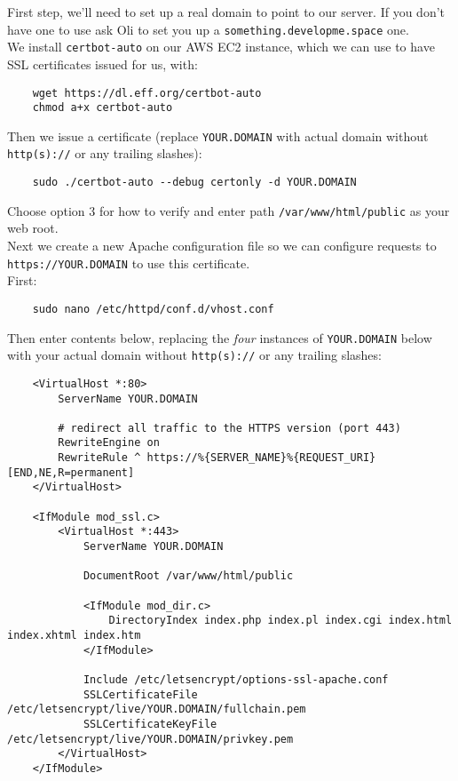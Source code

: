 First step, we'll need to set up a real domain to point to our server. If you don't have one to use ask Oli to set you up a \texttt{something.developme.space} one.
\\

We install \texttt{certbot-auto} on our AWS EC2 instance, which we can use to have SSL certificates issued for us, with:

\begin{verbatim}
    wget https://dl.eff.org/certbot-auto
    chmod a+x certbot-auto
\end{verbatim}

Then we issue a certificate (replace \texttt{YOUR.DOMAIN} with actual domain without \texttt{http(s)://} or any trailing slashes):

\begin{verbatim}
    sudo ./certbot-auto --debug certonly -d YOUR.DOMAIN
\end{verbatim}

Choose option 3 for how to verify and enter path \texttt{/var/www/html/public} as your web root.
\\

Next we create a new Apache configuration file so we can configure requests to \texttt{https://YOUR.DOMAIN} to use this certificate.
\\

First:

\begin{verbatim}
    sudo nano /etc/httpd/conf.d/vhost.conf
\end{verbatim}

Then enter contents below, replacing the \textit{four} instances of \texttt{YOUR.DOMAIN} below with your actual domain without \texttt{http(s)://} or any trailing slashes:

\begin{verbatim}
    <VirtualHost *:80>
        ServerName YOUR.DOMAIN

        # redirect all traffic to the HTTPS version (port 443)
        RewriteEngine on
        RewriteRule ^ https://%{SERVER_NAME}%{REQUEST_URI} [END,NE,R=permanent]
    </VirtualHost>

    <IfModule mod_ssl.c>
        <VirtualHost *:443>
            ServerName YOUR.DOMAIN

            DocumentRoot /var/www/html/public

            <IfModule mod_dir.c>
                DirectoryIndex index.php index.pl index.cgi index.html index.xhtml index.htm
            </IfModule>

            Include /etc/letsencrypt/options-ssl-apache.conf
            SSLCertificateFile /etc/letsencrypt/live/YOUR.DOMAIN/fullchain.pem
            SSLCertificateKeyFile /etc/letsencrypt/live/YOUR.DOMAIN/privkey.pem
        </VirtualHost>
    </IfModule>
\end{verbatim}

